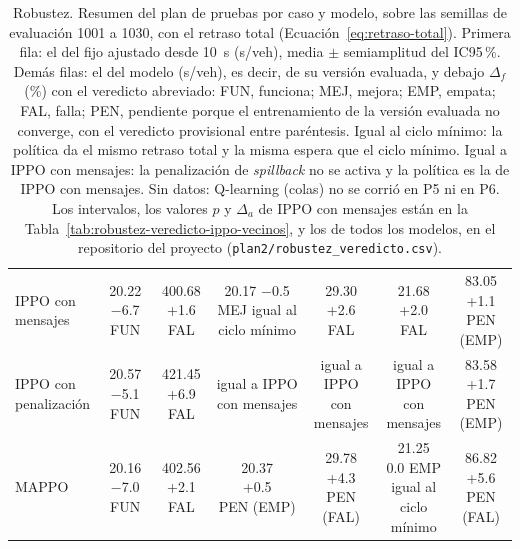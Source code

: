 \begin{table}[!tbp]
\begin{tabular}{lcccccc}
\makecell[l]{IPPO con\\mensajes} & \makecell{20.22\\$-$6.7 FUN} & \makecell{400.68\\+1.6 FAL} & \makecell{20.17\\$-$0.5 MEJ\\igual al\\ciclo mínimo} & \makecell{29.30\\+2.6 FAL} & \makecell{21.68\\+2.0 FAL} & \makecell{83.05\\+1.1\\PEN (EMP)} \\
\makecell[l]{IPPO con\\penalización} & \makecell{20.57\\$-$5.1 FUN} & \makecell{421.45\\+6.9 FAL} & \makecell{igual a IPPO\\con mensajes} & \makecell{igual a IPPO\\con mensajes} & \makecell{igual a IPPO\\con mensajes} & \makecell{83.58\\+1.7\\PEN (EMP)} \\
MAPPO & \makecell{20.16\\$-$7.0 FUN} & \makecell{402.56\\+2.1 FAL} & \makecell{20.37\\+0.5\\PEN (EMP)} & \makecell{29.78\\+4.3\\PEN (FAL)} & \makecell{21.25\\0.0 EMP\\igual al\\ciclo mínimo} & \makecell{86.82\\+5.6\\PEN (FAL)} \\
\bottomrule
\end{tabular}
\caption[Robustez: retraso y cambio frente al fijo por caso y modelo]{Robustez. Resumen del plan de pruebas por caso y modelo, sobre las semillas de evaluación 1001 a 1030, con el retraso total (Ecuación~\ref{eq:retraso-total}). Primera fila: el del fijo ajustado desde 10~s (s/veh), media $\pm$ semiamplitud del IC95\,\%. Demás filas: el del modelo (s/veh), es decir, de su versión evaluada, y debajo $\Delta_f$ (\%) con el veredicto abreviado: FUN, funciona; MEJ, mejora; EMP, empata; FAL, falla; PEN, pendiente porque el entrenamiento de la versión evaluada no converge, con el veredicto provisional entre paréntesis. Igual al ciclo mínimo: la política da el mismo retraso total y la misma espera que el ciclo mínimo. Igual a IPPO con mensajes: la penalización de \textit{spillback} no se activa y la política es la de IPPO con mensajes. Sin datos: Q-learning (colas) no se corrió en P5 ni en P6. Los intervalos, los valores $p$ y $\Delta_a$ de IPPO con mensajes están en la Tabla~\ref{tab:robustez-veredicto-ippo-vecinos}, y los de todos los modelos, en el repositorio del proyecto (\texttt{plan2/\allowbreak robustez\_veredicto.csv}).}
\label{tab:robustez-plan2-resumen}
\end{table}
